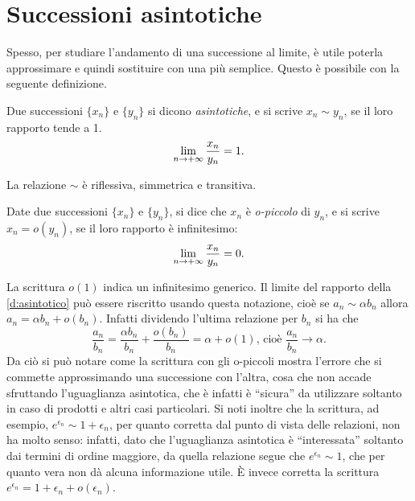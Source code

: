 \section{Successioni asintotiche}
Spesso, per studiare l'andamento di una successione al limite, è utile poterla approssimare e quindi sostituire con una più semplice. Questo è possibile con la seguente definizione.
\begin{definizione}
\label{d:asintotico}
Due successioni $\{x_n\}$ e $\{y_n\}$ si dicono \emph{asintotiche}, e si scrive $x_n\sim y_n$, se il loro rapporto tende a 1.
\[
\lim_{n\to +\infty}\frac{x_n}{y_n}=1.
\]
\end{definizione}
La relazione $\sim$ è riflessiva, simmetrica e transitiva.
\begin{definizione}
Date due successioni $\{x_n\}$ e $\{y_n\}$, si dice che $x_n$ è \emph{o-piccolo} di $y_n$, e si scrive $x_n=o(y_n)$, se il loro rapporto è infinitesimo:
\[
\lim_{n\to +\infty}\frac{x_n}{y_n}=0.
\]
\end{definizione}
La scrittura $o(1)$ indica un infinitesimo generico.
Il limite del rapporto della \ref{d:asintotico} può essere riscritto usando questa notazione, cioè se $a_n\sim\alpha b_n$ allora $a_n=\alpha b_n+o(b_n)$. Infatti dividendo l'ultima relazione per $b_n$ si ha che
\[
\frac{a_n}{b_n}=\frac{\alpha b_n}{b_n}+\frac{o(b_n)}{b_n}=\alpha+o(1)\text{, cioè }\frac{a_n}{b_n}\to\alpha.
\]
Da ciò si può notare come la scrittura con gli o-piccoli mostra l'errore che si commette approssimando una successione con l'altra, cosa che non accade sfruttando l'uguaglianza asintotica, che è infatti è ``sicura'' da utilizzare soltanto in caso di prodotti e altri casi particolari.
Si noti inoltre che la scrittura, ad esempio, $e^{\epsilon_n}\sim 1+\epsilon_n$, per quanto corretta dal punto di vista delle relazioni, non ha molto senso: infatti, dato che l'uguaglianza asintotica è ``interessata'' soltanto dai termini di ordine maggiore, da quella relazione segue che $e^{\epsilon_n}\sim 1$, che per quanto vera non dà alcuna informazione utile. È invece corretta la scrittura $e^{\epsilon_n}=1+\epsilon_n+o(\epsilon_n)$.

